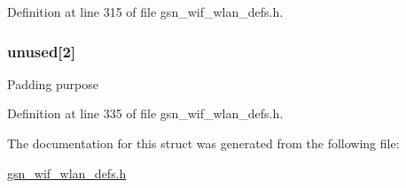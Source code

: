 Definition at line 315 of file gsn\_\-wif\_\-wlan\_\-defs.h.

\hypertarget{a00187_a06e630c1e888866376c77bea0c8ea6fa}{
\subsubsection[{unused}]{ {\bf unused}\mbox{[}2\mbox{]}}}
\label{a00187_a06e630c1e888866376c77bea0c8ea6fa}
Padding purpose 

Definition at line 335 of file gsn\_\-wif\_\-wlan\_\-defs.h.



The documentation for this struct was generated from the following file:\begin{DoxyCompactItemize}
\item 
\hyperlink{a00613}{gsn\_\-wif\_\-wlan\_\-defs.h}\end{DoxyCompactItemize}
